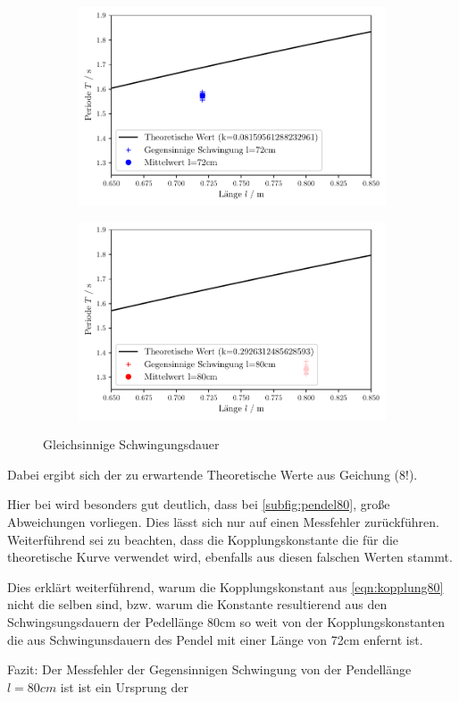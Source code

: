 \begin{figure}
    \begin{subfigure}[c]{0.5\textwidth}
        \includegraphics[width=\textwidth]{plots/plot2.pdf}
    \end{subfigure}
    \begin{subfigure}[c]{0.5\textwidth}
        \includegraphics[width=\textwidth]{plots/plot3.pdf}
        \label{subfig:pedel80}
    \end{subfigure}
    \caption{Gleichsinnige Schwingungsdauer}
\end{figure}

Dabei ergibt sich der zu erwartende Theoretische Werte aus Geichung (8!).

Hier bei wird besonders gut deutlich, dass bei \ref{subfig:pendel80}, große Abweichungen
vorliegen. Dies lässt sich nur auf einen Messfehler zurückführen.
Weiterführend sei zu beachten, dass die Kopplungskonstante die für die theoretische Kurve
verwendet wird, ebenfalls aus diesen falschen Werten stammt.

Dies erklärt weiterführend, warum die Kopplungskonstant aus \ref{eqn:kopplung80} nicht die selben
sind, bzw. warum die Konstante resultierend aus den Schwingsungsdauern der Pedellänge 80cm so weit von der
Kopplungskonstanten die aus Schwingunsdauern des Pendel mit einer Länge von 72cm enfernt ist.

Fazit: Der Messfehler der Gegensinnigen Schwingung von der Pendellänge $l=80cm$ ist 
ist ein Ursprung der 